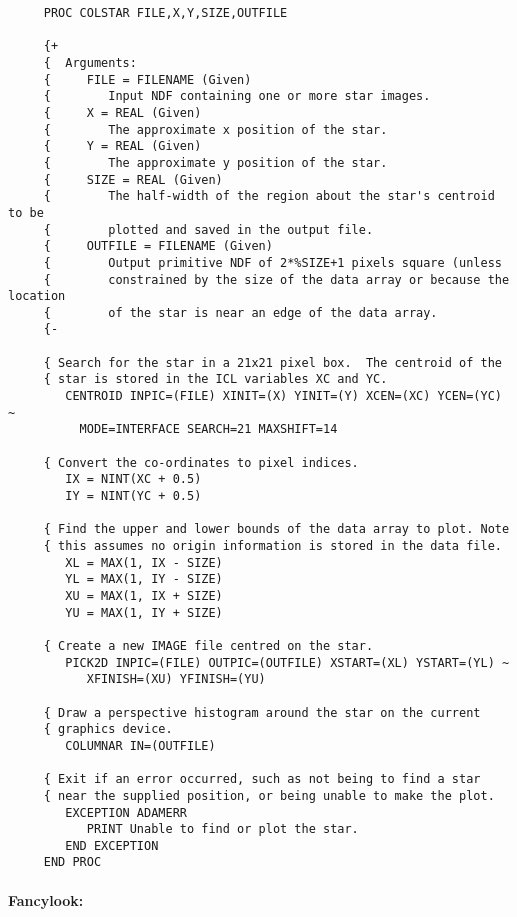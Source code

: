 \begin{small}
\begin{verbatim}
     PROC COLSTAR FILE,X,Y,SIZE,OUTFILE

     {+
     {  Arguments:
     {     FILE = FILENAME (Given)
     {        Input NDF containing one or more star images.
     {     X = REAL (Given)
     {        The approximate x position of the star.
     {     Y = REAL (Given)
     {        The approximate y position of the star.
     {     SIZE = REAL (Given)
     {        The half-width of the region about the star's centroid to be
     {        plotted and saved in the output file.
     {     OUTFILE = FILENAME (Given)
     {        Output primitive NDF of 2*%SIZE+1 pixels square (unless
     {        constrained by the size of the data array or because the location
     {        of the star is near an edge of the data array.
     {-

     { Search for the star in a 21x21 pixel box.  The centroid of the
     { star is stored in the ICL variables XC and YC.
        CENTROID INPIC=(FILE) XINIT=(X) YINIT=(Y) XCEN=(XC) YCEN=(YC) ~
          MODE=INTERFACE SEARCH=21 MAXSHIFT=14

     { Convert the co-ordinates to pixel indices.
        IX = NINT(XC + 0.5)
        IY = NINT(YC + 0.5)

     { Find the upper and lower bounds of the data array to plot. Note
     { this assumes no origin information is stored in the data file.
        XL = MAX(1, IX - SIZE)
        YL = MAX(1, IY - SIZE)
        XU = MAX(1, IX + SIZE)
        YU = MAX(1, IY + SIZE)

     { Create a new IMAGE file centred on the star.
        PICK2D INPIC=(FILE) OUTPIC=(OUTFILE) XSTART=(XL) YSTART=(YL) ~
           XFINISH=(XU) YFINISH=(YU)

     { Draw a perspective histogram around the star on the current 
     { graphics device.
        COLUMNAR IN=(OUTFILE)

     { Exit if an error occurred, such as not being to find a star
     { near the supplied position, or being unable to make the plot.
        EXCEPTION ADAMERR
           PRINT Unable to find or plot the star.
        END EXCEPTION
     END PROC
\end{verbatim}
\end{small}

\paragraph{Fancylook:}\hfill

